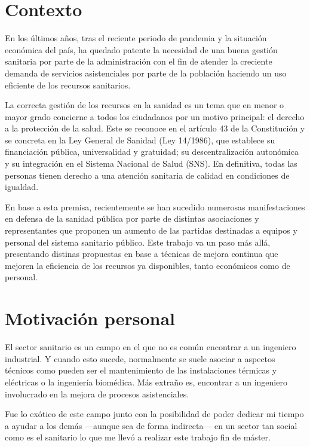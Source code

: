 \section{Contexto}

En los últimos años, tras el reciente periodo de pandemia y la situación económica del país, ha quedado patente la necesidad de una buena gestión sanitaria por parte de la administración con el fin de atender la creciente demanda de servicios asistenciales por parte de la población haciendo un uso eficiente de los recursos sanitarios.

La correcta gestión de los recursos en la sanidad es un tema que en menor o mayor grado concierne a todos los ciudadanos por un motivo principal: el derecho a la protección de la salud. Este se reconoce en el artículo 43 de la Constitución y se concreta en la Ley General de Sanidad (Ley 14/1986), que establece su financiación pública, universalidad y gratuidad; su descentralización autonómica y su integración en el Sistema Nacional de Salud (SNS). En definitiva, todas las personas tienen derecho a una atención sanitaria de calidad en condiciones de igualdad.

En base a esta premisa, recientemente se han sucedido numerosas manifestaciones en defensa de la sanidad pública por parte de distintas asociaciones y representantes que proponen un aumento de las partidas destinadas a equipos y personal del sistema sanitario público. Este trabajo va un paso más allá, presentando distinas propuestas en base a técnicas de mejora continua que mejoren la eficiencia de los recursos ya disponibles, tanto económicos como de personal.

\section{Motivación personal}

El sector sanitario es un campo en el que no es común encontrar a un ingeniero industrial. Y cuando esto sucede, normalmente se suele asociar a aspectos técnicos como pueden ser el mantenimiento de las instalaciones térmicas y eléctricas o la ingeniería biomédica. Más extraño es, encontrar a un ingeniero involucrado en la mejora de procesos asistenciales.

Fue lo exótico de este campo junto con la posibilidad de poder dedicar mi tiempo a ayudar a los demás —aunque sea de forma indirecta— en un sector tan social como es el sanitario lo que me llevó a realizar este trabajo fin de máster.

